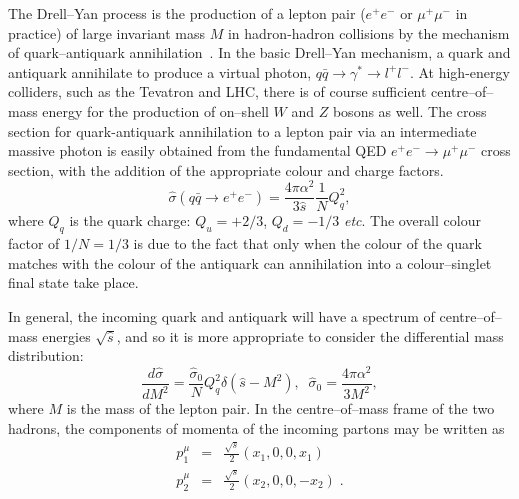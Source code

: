 \documentclass[12pt]{iopart}
\def\beq{\begin{equation}}
\def\eeq{\end{equation}}
\def\beqn{\begin{eqnarray}}
\def\eeqn{\end{eqnarray}}
\begin{document}
The Drell--Yan process is the production of a lepton pair ($e^+e^-$ or
$ \mu^+ \mu^-$ in practice) of large invariant mass $M$ in hadron-hadron collisions by the
mechanism of quark--antiquark annihilation~\cite{DRELL}.
In the basic  Drell--Yan mechanism, a quark and antiquark
annihilate to produce  a virtual photon, $q \bar q \to \gamma^* \to 
l^+l^-$.  At high-energy colliders, such as the Tevatron and LHC, there is
of course sufficient
centre--of--mass energy for the production of on--shell $W$ and $Z$ bosons
as well.
The cross section for quark-antiquark annihilation to a lepton
pair via an intermediate massive photon is easily obtained from the
fundamental QED $e^+e^-\rightarrow \mu^+\mu^-$ cross section, with the addition
of the appropriate colour and charge factors.
\beq
\hat\sigma(q\bar{q} \rightarrow e^+e^-) 
=\frac{4 \pi \alpha^2}{3 \hat{s}}
\frac{1}{N} Q_q^2  ,
\label{dy:1}
\eeq
where $Q_q$ is the quark charge: $Q_u = +2/3$, $Q_d = -1/3$ {\it etc}.
The overall colour factor of $1/N= 1/3$ is due to the fact that only when the 
colour of the quark matches with the colour of the antiquark can 
annihilation into a colour--singlet final state take place.

In general, the incoming quark and antiquark will have a spectrum of
centre--of--mass energies $\sqrt{\hat{s}}$, and so it is more appropriate to consider
the differential mass distribution:
\beq 
\frac{d \hat{\sigma} }{d M^2}  = \frac{\hat{\sigma}_0}{N} Q_q^2 \delta (\hat{s}
-M^2), \;\;\hat{\sigma}_0 = \frac{4 \pi \alpha^2}{3 M^2} ,
\label{dy:2}
\eeq
where $M$ is the mass of the lepton pair.
In the centre--of--mass frame of the two hadrons, the components of momenta of
the incoming partons may be written as
\beqn 
p_1^\mu &=& \frac{\sqrt{s}}{2} ( x_1,0,0,x_1) \nonumber \\
p_2^\mu &=& \frac{\sqrt{s}}{2} ( x_2,0,0,-x_2)\; . 
\label{dy:3}
\eeqn
\end{document}
